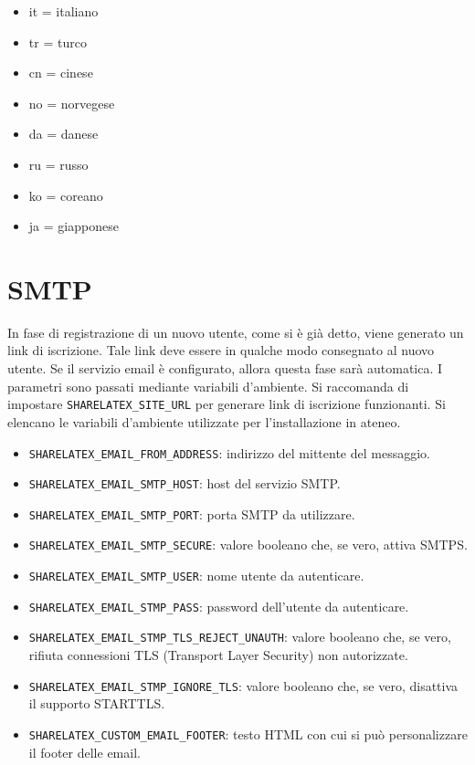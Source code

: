 \begin{itemize}
\begin{multicols}{3}
\begin{itemize}
                \item it = italiano
                \item tr = turco
                \item cn = cinese
                \item no = norvegese
                \item da = danese
                \item ru = russo
                \item ko = coreano
                \item ja = giapponese
            \end{itemize}
        \end{multicols}
\end{itemize}

\section{SMTP}
\label{SMTP}
In fase di registrazione di un nuovo utente, come si è già detto, viene generato un link di iscrizione. Tale link deve essere in qualche modo consegnato al nuovo utente. Se il servizio email è configurato, allora questa fase sarà automatica. I parametri sono passati mediante variabili d'ambiente. Si raccomanda di impostare \verb|SHARELATEX_SITE_URL| per generare link di iscrizione funzionanti. Si elencano le variabili d'ambiente utilizzate per l'installazione in ateneo.
\begin{itemize}
    \item \verb|SHARELATEX_EMAIL_FROM_ADDRESS|: indirizzo del mittente del messaggio.
    \item \verb|SHARELATEX_EMAIL_SMTP_HOST|: host del servizio SMTP.
    \item \verb|SHARELATEX_EMAIL_SMTP_PORT|: porta SMTP da utilizzare.
    \item \verb|SHARELATEX_EMAIL_SMTP_SECURE|: valore booleano che, se vero, attiva SMTPS.
    \item \verb|SHARELATEX_EMAIL_SMTP_USER|: nome utente da autenticare.
    \item \verb|SHARELATEX_EMAIL_STMP_PASS|: password dell'utente da autenticare.
    \item \verb|SHARELATEX_EMAIL_STMP_TLS_REJECT_UNAUTH|: valore booleano che, se vero, rifiuta connessioni TLS (Transport Layer Security) non autorizzate.
    \item \verb|SHARELATEX_EMAIL_STMP_IGNORE_TLS|: valore booleano che, se vero, disattiva il supporto STARTTLS.
    \item \verb|SHARELATEX_CUSTOM_EMAIL_FOOTER|: testo HTML con cui si può personalizzare il footer delle email.
\end{itemize}